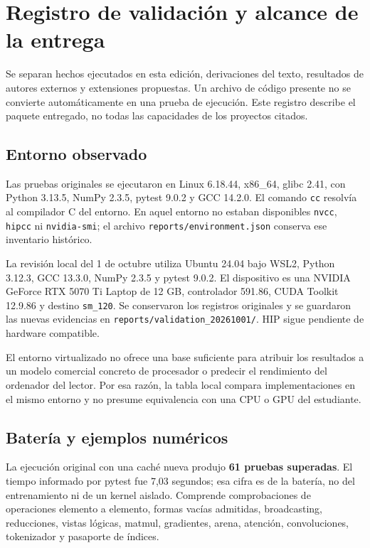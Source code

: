 \chapter{Registro de validación y alcance de la entrega}\label{app:validacion}
\begin{idea}
Se separan hechos ejecutados en esta edición, derivaciones del texto, resultados de autores externos y extensiones propuestas. Un archivo de código presente no se convierte automáticamente en una prueba de ejecución. Este registro describe el paquete entregado, no todas las capacidades de los proyectos citados.
\end{idea}

\section{Entorno observado}
Las pruebas originales se ejecutaron en Linux 6.18.44, x86\_64, glibc 2.41, con Python 3.13.5, NumPy 2.3.5, pytest 9.0.2 y GCC 14.2.0. El comando \texttt{cc} resolvía al compilador C del entorno. En aquel entorno no estaban disponibles \texttt{nvcc}, \texttt{hipcc} ni \texttt{nvidia-smi}; el archivo \texttt{reports/environment.json} conserva ese inventario histórico.

La revisión local del 1 de octubre utiliza Ubuntu 24.04 bajo WSL2, Python 3.12.3, GCC 13.3.0, NumPy 2.3.5 y pytest 9.0.2. El dispositivo es una NVIDIA GeForce RTX 5070 Ti Laptop de 12 GB, controlador 591.86, CUDA Toolkit 12.9.86 y destino \texttt{sm\_120}. Se conservaron los registros originales y se guardaron las nuevas evidencias en \texttt{reports/validation\_20261001/}. HIP sigue pendiente de hardware compatible.

El entorno virtualizado no ofrece una base suficiente para atribuir los resultados a un modelo comercial concreto de procesador o predecir el rendimiento del ordenador del lector. Por esa razón, la tabla local compara implementaciones en el mismo entorno y no presume equivalencia con una CPU o GPU del estudiante.

\section{Batería y ejemplos numéricos}
La ejecución original con una caché nueva produjo \textbf{61 pruebas superadas}. El tiempo informado por pytest fue 7,03 segundos; esa cifra es de la batería, no del entrenamiento ni de un kernel aislado. Comprende comprobaciones de operaciones elemento a elemento, formas vacías admitidas, broadcasting, reducciones, vistas lógicas, matmul, gradientes, arena, atención, convoluciones, tokenizador y pasaporte de índices.

